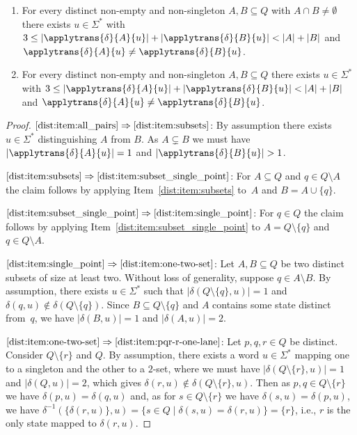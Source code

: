 \begin{theorem}
\begin{enumerate}
		\item \label{dist:item:dcps-nondisjoint} For every distinct non-empty and non-singleton $A, B \subseteq Q$ with $A \cap B \ne \emptyset$
		there exists $u \in \Sigma^*$
		with $3 \le |\applytrans{\delta}{A}{u}| + |\applytrans{\delta}{B}{u}| < |A| + |B|$
		and $\applytrans{\delta}{A}{u} \ne \applytrans{\delta}{B}{u}$.		
		
		\item \label{dist:item:dcps} For every distinct non-empty and non-singleton $A, B \subseteq Q$  
		there exists $u \in \Sigma^*$
		with $3 \le |\applytrans{\delta}{A}{u}| + |\applytrans{\delta}{B}{u}| < |A| + |B|$
		and $\applytrans{\delta}{A}{u} \ne \applytrans{\delta}{B}{u}$.		
	\end{enumerate}
\end{theorem}
\begin{proof}
	$\ref{dist:item:all_pairs} \Rightarrow \ref{dist:item:subsets}$:
	By assumption there exists $u \in \Sigma^*$
	distinguishing $A$ from $B$.
	As $A \subsetneq B$
	we must have $|\applytrans{\delta}{A}{u}| = 1$
	and $|\applytrans{\delta}{B}{u}| > 1$.
	
	$\ref{dist:item:subsets} \Rightarrow \ref{dist:item:subset_single_point}$:
	For $A \subseteq Q$ and $q \in Q \setminus A$ the claim follows by applying Item~\ref{dist:item:subsets} to~$A$ and $B = A \cup \{q\}$.	
	
	$\ref{dist:item:subset_single_point} \Rightarrow \ref{dist:item:single_point}$: 
	For $q \in Q$ the claim follows	by applying Item~\ref{dist:item:subset_single_point} to $A = Q \setminus \{q\}$ and $q \in Q \setminus A$.
		
	$\ref{dist:item:single_point} \Rightarrow \ref{dist:item:one-two-set}$:
	Let $A,B \subseteq Q$ be two distinct subsets of size at least two.
	Without loss of generality, suppose $q \in A \setminus B$.
	By assumption, there exists $u \in \Sigma^*$
	such that $|\delta(Q \setminus \{q\}, u)| = 1$
	and $\delta(q, u) \notin \delta(Q \setminus \{q\})$.
	Since $B \subseteq Q \setminus\{q\}$
	and $A$ contains some state distinct from~$q$,    
	we have $|\delta(B, u)| = 1$
	and $|\delta(A, u)| = 2$.	
	
	$\ref{dist:item:one-two-set} \Rightarrow \ref{dist:item:pqr-r-one-lane}$:
	Let $p,q,r\in Q$ be distinct. Consider
	$Q \setminus \{r\}$ and $Q$.
	By assumption, there exists a word $u \in \Sigma^*$ mapping one to a singleton
	and the other to a $2$-set,
	where we must have $|\delta(Q \setminus \{r\}, u)| = 1$
	and $|\delta(Q, u)| = 2$, which gives $\delta(r, u) \notin \delta(Q \setminus \{r\}, u)$.
	Then as $p,q \in Q \setminus\{r\}$ we have $\delta(p, u) = \delta(q, u)$
	and, as for $s \in Q \setminus \{r\}$ we have $\delta(s, u) = \delta(p, u)$,
	we have $\delta^{-1}(\{\delta(r,u)\}, u) = \{ s \in Q \mid \delta(s, u) = \delta(r, u)\} = \{ r \}$, i.e.,
	$r$ is the only state mapped to $\delta(r, u)$.	
		

\end{proof}
